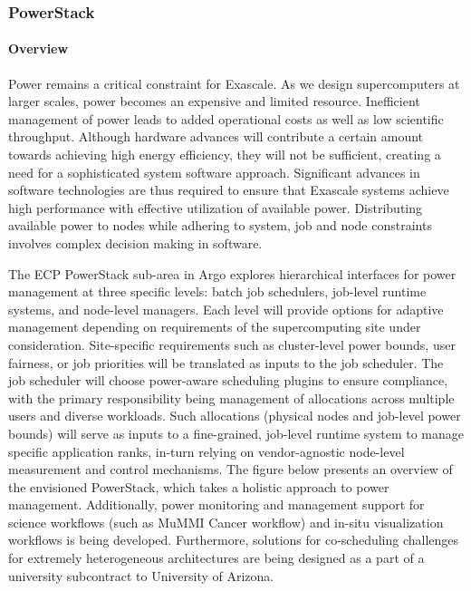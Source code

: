 \subsubsection*{PowerStack}

\paragraph{Overview} 
Power remains a critical constraint for Exascale. As we design supercomputers at larger scales, power becomes an expensive and limited resource. Inefficient management of power leads to added operational costs as well as low scientific throughput. Although hardware advances will contribute a certain amount towards achieving high energy efficiency, they will not be sufficient, creating a need for a sophisticated system software approach. Significant advances in software technologies are thus required to ensure that Exascale systems achieve high performance with effective utilization of available power. Distributing available power to nodes while adhering to system, job and node constraints involves complex decision making in software. 

The ECP PowerStack sub-area in Argo explores hierarchical interfaces for power management at three specific levels: batch job schedulers, job-level runtime systems, and node-level managers. Each level will provide options for adaptive management depending on requirements of the supercomputing site under consideration. Site-specific requirements such as cluster-level power bounds, user fairness, or job priorities will be translated as inputs to the job scheduler. The job scheduler will choose power-aware scheduling plugins to ensure compliance, with the primary responsibility being management of allocations across multiple users and diverse workloads. Such allocations (physical nodes and job-level power bounds) will serve as inputs to a fine-grained, job-level runtime system to manage specific application ranks, in-turn relying on vendor-agnostic node-level measurement and control mechanisms. The figure below presents an overview of the envisioned PowerStack, which takes a holistic approach to power management.  Additionally, power monitoring and management support for science workflows (such as MuMMI Cancer workflow) and in-situ visualization workflows is being developed. Furthermore, solutions for co-scheduling challenges for extremely heterogeneous architectures are being designed as a part of a university subcontract to University of Arizona. 

